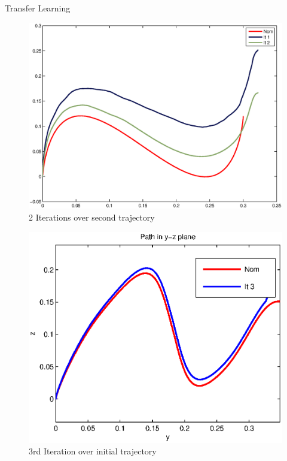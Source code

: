 \documentclass[handout]{beamer}
\begin{document}
\begin{frame}{Transfer Learning}
\begin{figure}
\center
\includegraphics[scale=0.20]{transfer_learning1.eps}			
\caption{2 Iterations over second trajectory}
\end{figure}
\begin{figure}
\center
\includegraphics[scale=0.20]{transfer_learning2.eps}			
\caption{3rd Iteration over initial trajectory}
\end{figure}
\end{frame}
%
\end{document}
